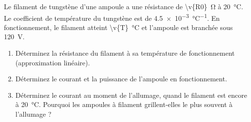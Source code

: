 Le filament de tungstène d'une ampoule a une résistance de \qty{\v{R0}}{\ohm} à \qty{20}{\celsius}. Le coefficient de température du tungstène est de \qty{4.5e-3}{\celsius^{-1}}. En fonctionnement, le filament atteint \qty{\v{T}}{\celsius} et l'ampoule est branchée sous \qty{120}{V}.

\begin{enumerate}[label=\alph*)]
    \item Déterminez la résistance du filament à sa température de fonctionnement (approximation linéaire).
    \item Déterminez le courant et la puissance de l'ampoule en fonctionnement.
    \item Déterminez le courant au moment de l'allumage, quand le filament est encore à \qty{20}{\celsius}. Pourquoi les ampoules à filament grillent-elles le plus souvent à l'allumage ?
\end{enumerate}
